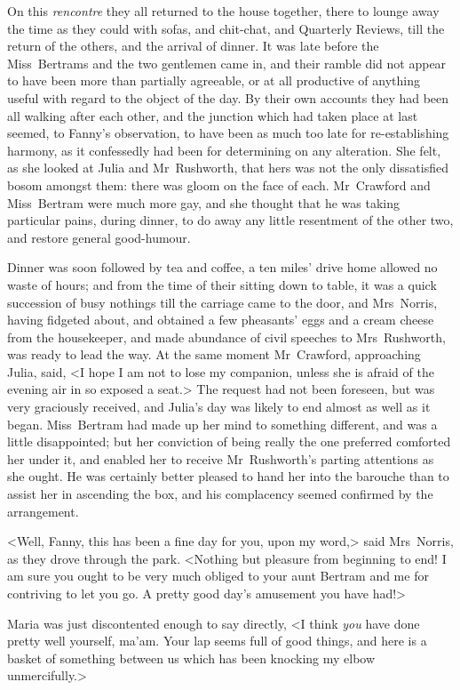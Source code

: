On this \textit{rencontre}  they all returned to the house together, there to lounge away the time as they could with sofas, and chit-chat, and Quarterly Reviews, till the return of the others, and the arrival of dinner. It was late before the Miss~Bertrams and the two gentlemen came in, and their ramble did not appear to have been more than partially agreeable, or at all productive of anything useful with regard to the object of the day. By their own accounts they had been all walking after each other, and the junction which had taken place at last seemed, to Fanny's observation, to have been as much too late for re-establishing harmony, as it confessedly had been for determining on any alteration. She felt, as she looked at Julia and Mr~Rushworth, that hers was not the only dissatisfied bosom amongst them: there was gloom on the face of each. Mr~Crawford and Miss~Bertram were much more gay, and she thought that he was taking particular pains, during dinner, to do away any little resentment of the other two, and restore general good-humour.

Dinner was soon followed by tea and coffee, a ten miles' drive home allowed no waste of hours; and from the time of their sitting down to table, it was a quick succession of busy nothings till the carriage came to the door, and Mrs~Norris, having fidgeted about, and obtained a few pheasants' eggs and a cream cheese from the housekeeper, and made abundance of civil speeches to Mrs~Rushworth, was ready to lead the way. At the same moment Mr~Crawford, approaching Julia, said, <I hope I am not to lose my companion, unless she is afraid of the evening air in so exposed a seat.> The request had not been foreseen, but was very graciously received, and Julia's day was likely to end almost as well as it began. Miss~Bertram had made up her mind to something different, and was a little disappointed; but her conviction of being really the one preferred comforted her under it, and enabled her to receive Mr~Rushworth's parting attentions as she ought. He was certainly better pleased to hand her into the barouche than to assist her in ascending the box, and his complacency seemed confirmed by the arrangement.

<Well, Fanny, this has been a fine day for you, upon my word,> said Mrs~Norris, as they drove through the park. <Nothing but pleasure from beginning to end! I am sure you ought to be very much obliged to your aunt Bertram and me for contriving to let you go. A pretty good day's amusement you have had!>

Maria was just discontented enough to say directly, <I think \textit{you}  have done pretty well yourself, ma'am. Your lap seems full of good things, and here is a basket of something between us which has been knocking my elbow unmercifully.>

